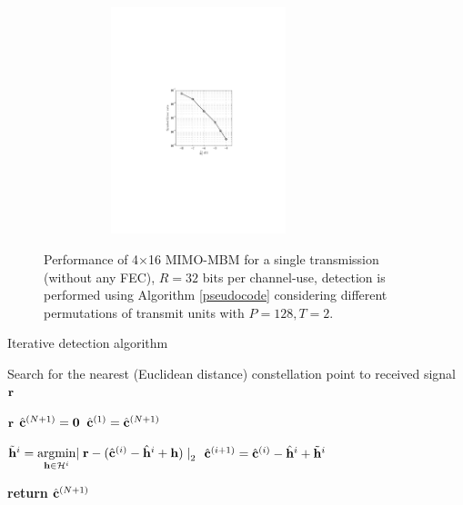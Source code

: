 \begin{figure}[t]
\centering
\hspace{-1cm}
\vspace{0cm}

{\includegraphics[height = 6.6cm, width = 9cm, trim = 6cm 9.6cm 6cm 10cm ]{./fig/algorithm_performance}}
\caption{Performance of 4$\times$16 MIMO-MBM for a single transmission (without any FEC), $R = 32$ bits per channel-use, detection is performed using Algorithm \ref{pseudocode} considering different permutations of transmit units with $ P = 128, T =2$.}
\label{algorithmPerformance}
\end{figure}

\begin{algorithm}[t]
\caption{Iterative detection algorithm}\label{pseudocode}
 Search for the nearest (Euclidean distance) constellation point to received signal $\mathbf{r}$ 
\begin{algorithmic}[1]
 {$\mathbf{r}$}
\State $\hat{\mathbf{c} } ^ {(N+1)} = \mathbf{0}$
 
\State $\hat{\mathbf{c} } ^ {(1)} = \hat{\mathbf{c} } ^ {(N+1)}$
 

\State $\tilde{\mathbf{h}}^{i} = \underset{\mathbf{h} \in  \mathcal{H}^{i}}{\text{argmin}} {\mid \mathbf{r} - (\hat{\mathbf{c} } ^ {(i)} - \hat{\mathbf{h}}^{i}+ \mathbf{h})\mid} _ 2$
\State $\hat{\mathbf{c} } ^ {(i+1)} = \hat{\mathbf{c} } ^ {(i)}- \hat{\mathbf{h}}^{i}+ \tilde{\mathbf{h}}^{i}$

\EndFor\label{tend}
\EndFor
\State \textbf{return}  $\hat{\mathbf{c} } ^ {(N+1)}$
\EndFunction

\end{algorithmic}
\end{algorithm}

